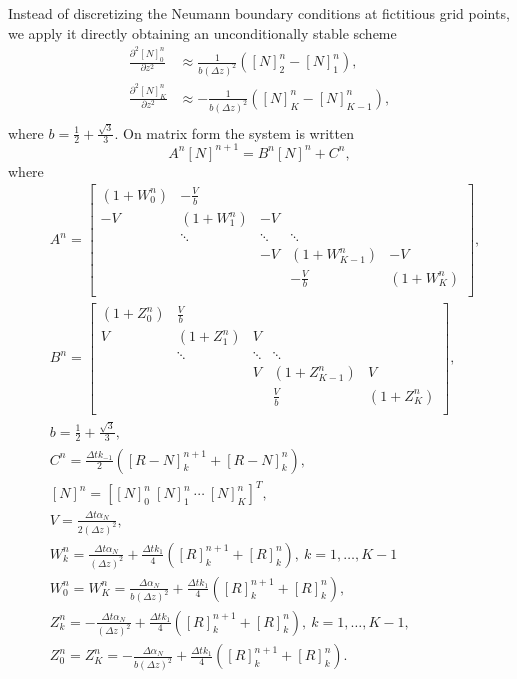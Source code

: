 \documentclass{article}
\begin{document}
Instead of discretizing the Neumann boundary conditions at fictitious grid points, we apply it directly obtaining an unconditionally stable scheme \cite{khaliq}
\begin{align*}
        \frac{\partial^2 [N]_0^{n}}{\partial z^2} &\approx \frac{1}{b (\Delta z)^2}([N]_2^n - [N]_1^n), \\
        \frac{\partial^2 [N]_K^{n}}{\partial z^2} &\approx -\frac{1}{b (\Delta z)^2}([N]_K^n - [N]_{K-1}^n), \\
\end{align*}
where $b = \frac{1}{2} + \frac{\sqrt{3}}{3}$.
On matrix form the system is written
\begin{equation}\label{eq:system}
        A^n[N]^{n+1} = B^n[N]^n + C^n,
\end{equation}
where
\begin{align*}
        &A^n =   
\begin{bmatrix}
        \left( 1 + W_0^n \right) & -\frac{V}{b} &   &  &  \\
        -V & \left(1 + W_1^n \right) & -V  &  &   \\
         & \ddots & \ddots & \ddots &    \\
         &  & -V & \left( 1 + W_{K-1}^n \right) & -V   \\
         &  &  &  -\frac{V}{b} & \left( 1 + W_K^n \right) \\
\end{bmatrix}
,\\
        &B^n = 
\begin{bmatrix}
        \left( 1 + Z_0^n \right) & \frac{V}{b} &   &  &  \\
        V & \left(1 + Z_1^n \right) & V  &  &   \\
         & \ddots & \ddots & \ddots &    \\
         &  & V & \left( 1 + Z_{K-1}^n \right) & V   \\
         &  &  &  \frac{V}{b} & \left( 1 + Z_K^n \right) \\
\end{bmatrix}
,\\
        &b = \frac{1}{2} + \frac{\sqrt{3}}{3}, \\
        &C^n= \frac{\Delta t k_{-1}}{2}([R-N]_k^{n+1} + [R-N]_k^n ) ,\\
        &[N]^n = [[N]_0^n \ [N]_1^n \ \cdots \ [N]_K^n]^T ,\\
        &V = \frac{\Delta t \alpha_N}{2(\Delta z)^2} ,\\
        &W_k^n = \frac{\Delta t \alpha_N}{(\Delta z)^2} + \frac{\Delta t k_1}{4}([R]_{k}^{n+1} + [R]_k^n), \ k = 1, \hdots, K - 1 \\
        &W_0^n = W_K^n = \frac{\Delta \alpha_N}{b(\Delta z)^2} + \frac{\Delta t k_1}{4}([R]_{k}^{n+1} + [R]_k^n),\\
        &Z_k^n = -\frac{\Delta t \alpha_N}{(\Delta z)^2} + \frac{\Delta t k_1}{4}([R]_{k}^{n+1} + [R]_k^n), \ k = 1, \hdots, K- 1, \\
        &Z_0^n = Z_K^n = -\frac{\Delta \alpha_N}{b(\Delta z)^2} + \frac{\Delta t k_1}{4}([R]_{k}^{n+1} + [R]_k^n).
\end{align*}
\end{document}
